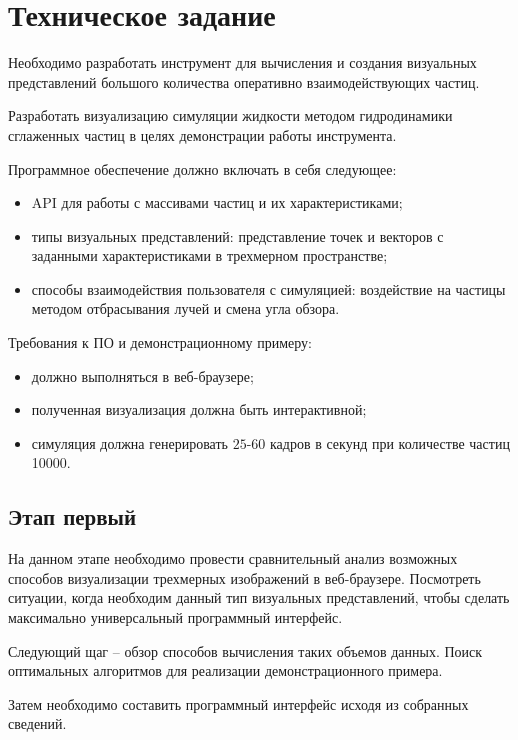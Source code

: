 \newpage
\section{Техническое задание}

Необходимо разработать инструмент для вычисления и создания визуальных 
представлений большого количества оперативно взаимодействующих частиц.

Разработать визуализацию симуляции жидкости методом гидродинамики сглаженных
частиц в целях демонстрации работы инструмента.

Программное обеспечение должно включать в себя следующее:

\begin{itemize}
  \item API для работы с массивами частиц и их характеристиками;
  \item типы визуальных представлений: представление точек и векторов с заданными 
    характеристиками в трехмерном пространстве;
  \item способы взаимодействия пользователя с симуляцией: воздействие на частицы 
    методом отбрасывания лучей и смена угла обзора.
\end{itemize}

Требования к ПО и демонстрационному примеру:

\begin{itemize}
  \item должно выполняться в веб-браузере;
  \item полученная визуализация должна быть интерактивной;
  \item симуляция должна генерировать $25$-$60$ кадров в секунд 
    при количестве частиц 10000.
\end{itemize}

\subsection{Этап первый}

На данном этапе необходимо провести сравнительный анализ возможных способов визуализации
трехмерных изображений в веб-браузере. Посмотреть ситуации, когда необходим данный тип 
визуальных представлений, чтобы сделать максимально универсальный программный интерфейс.

Следующий щаг -- обзор способов вычисления таких объемов данных. Поиск оптимальных
алгоритмов для реализации демонстрационного примера.

Затем необходимо составить программный интерфейс исходя из собранных сведений.

